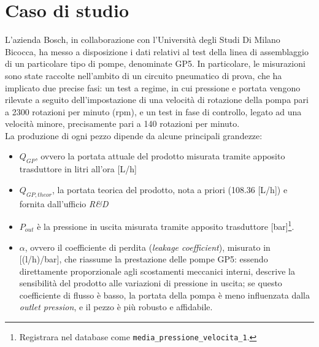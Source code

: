 \documentclass[fleqn,10pt]{SelfArx} %
\affiliation{\textsuperscript{1}\textit{794126, Dipartimento di Informatica, Sistemistica e Comunicazione}} %
\affiliation{\textsuperscript{2}\textit{793516, Dipartimento di Informatica, Sistemistica e Comunicazione}} %
\affiliation{\textsuperscript{3}\textit{850334, Dipartimento di Informatica, Sistemistica e Comunicazione}}
\begin{document}
\flushbottom %

\maketitle %

\tableofcontents %

\thispagestyle{empty} %


\section{Caso di studio}
L'azienda Bosch, in collaborazione con l'Università degli Studi Di Milano Bicocca, ha messo a disposizione i dati relativi al test della linea di assemblaggio di un particolare tipo di pompe, denominate GP5. In particolare, le misurazioni sono state raccolte nell'ambito di un circuito pneumatico di prova, che ha implicato due precise fasi: un test a regime, in cui pressione e portata vengono rilevate a seguito dell'impostazione di una velocità di rotazione della pompa pari a 2300 rotazioni per minuto (rpm), e un test in fase di controllo, legato ad una velocità minore, precisamente pari a 140 rotazioni per minuto.\\
La produzione di ogni pezzo dipende da alcune principali grandezze: 
\begin{itemize}
    \item $Q_{GP}$, ovvero la portata attuale del prodotto misurata tramite apposito trasduttore in litri all'ora [L/h]
    \item $Q_{GP,theor}$, la portata teorica del prodotto, nota a priori (108.36 [L/h]) e fornita dall’ufficio \textit{R\&D}
    \item $P_{out}$ è la pressione in uscita misurata tramite apposito trasduttore [bar]\footnote{Registrara nel database come \texttt{media\_pressione\_velocita\_1}.}.
    \item $\alpha$, ovvero il coefficiente di perdita (\textit{leakage coefficient}), misurato in [(l/h)/bar], che riassume la prestazione delle pompe GP5: essendo direttamente proporzionale agli scostamenti meccanici interni, descrive la sensibilità del prodotto alle variazioni di pressione in uscita; se questo coefficiente di flusso è basso, la portata della pompa è meno influenzata dalla \textit{outlet pression}, e il pezzo è più robusto e affidabile.
\end{itemize}
\end{document}
